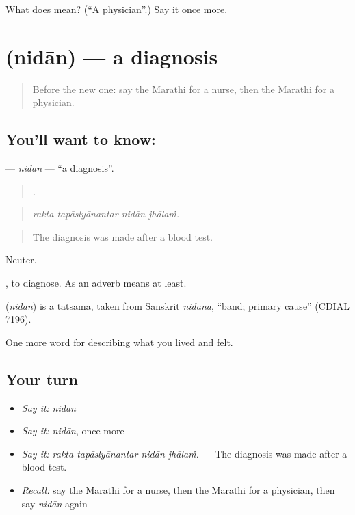 \begin{tcolorbox}[breakable,colback=teal!4,colframe=teal!35!black,title={Before you move on}]
What does  mean? (\textquotedblleft{}A physician\textquotedblright{}.) Say it once more.
\end{tcolorbox}
\section[\texorpdfstring{\mr{निदान} (nidān)}{निदान (nidān)}]{ (nidān) — a diagnosis}

\label{lesson:MR-C488-nidan}



\begin{quote}
Before the new one: say the Marathi for a nurse, then the Marathi for a physician.
\end{quote}

\subsection*{You'll want to know: }
\textbf{} — \emph{nidān} — \textquotedblleft{}a diagnosis\textquotedblright{}.

\begin{quote}
   .
\end{quote}

\begin{quote}
\emph{rakta tapāslyānantar nidān jhālaṁ.}
\end{quote}

\begin{quote}
The diagnosis was made after a blood test.
\end{quote}

Neuter.

 , to diagnose. As an adverb  means at least.

\begin{cousinweb}
\textbf{} (\emph{nidān}) is a tatsama, taken from Sanskrit \emph{nidāna}, \textquotedblleft{}band; primary cause\textquotedblright{} (CDIAL 7196).
\end{cousinweb}

\begin{grammarlens}[title={What you've built}]
One more word for describing what you lived and felt.
\end{grammarlens}

\subsection*{Your turn}
\begin{itemize}
\raggedright
  \item \emph{Say it:} \emph{nidān}
  \item \emph{Say it:} \emph{nidān}, once more
  \item \emph{Say it:} \emph{rakta tapāslyānantar nidān jhālaṁ.} — The diagnosis was made after a blood test.
  \item \emph{Recall:} say the Marathi for a nurse, then the Marathi for a physician, then say \emph{nidān} again
\end{itemize}

